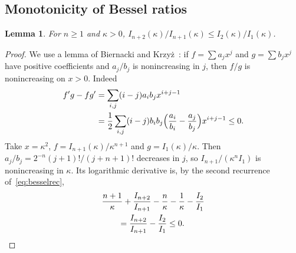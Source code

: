 \documentclass[aps,prd,twocolumn,superscriptaddress,nofootinbib,longbibliography,floatfix,amsmath,amssymb,10pt]{revtex4-2}
\newtheorem{lemma}[theorem]{Lemma}
\theoremstyle{definition}
\theoremstyle{remark}
\begin{document}
\subsection{Monotonicity of Bessel ratios}

\begin{lemma}\label{lem:ratio}
For $n\ge1$ and $\kappa>0$, $I_{n+2}(\kappa)/I_{n+1}(\kappa)\le I_2(\kappa)/
I_1(\kappa)$.
\end{lemma}

\begin{proof}
We use a lemma of Biernacki and Krzy\.z~\cite{BK55}: if $f=\sum a_jx^j$ and
$g=\sum b_jx^j$ have positive coefficients and $a_j/b_j$ is nonincreasing in
$j$, then $f/g$ is nonincreasing on $x>0$. Indeed
\[
\begin{aligned}
f'g-fg'&=\sum_{i,j}(i-j)a_ib_jx^{i+j-1}\\
&=\frac12\sum_{i,j}(i-j)b_ib_j\Bigl(\frac{a_i}{b_i}-\frac{a_j}{b_j}\Bigr)
x^{i+j-1}\le0 .
\end{aligned}
\]
Take $x=\kappa^2$, $f=I_{n+1}(\kappa)/\kappa^{n+1}$ and $g=I_1(\kappa)/\kappa$.
Then $a_j/b_j=2^{-n}(j+1)!/(j+n+1)!$ decreases in $j$, so $I_{n+1}/(\kappa^n
I_1)$ is nonincreasing in $\kappa$. Its logarithmic derivative is, by the
second recurrence of~\eqref{eq:besselrec},
\[
\begin{aligned}
&\frac{n+1}\kappa+\frac{I_{n+2}}{I_{n+1}}-\frac n\kappa-\frac1\kappa-\frac{I_2}
{I_1}\\
&\qquad=\frac{I_{n+2}}{I_{n+1}}-\frac{I_2}{I_1}\le0 .
\end{aligned}\qedhere
\]
\end{proof}
\end{document}
